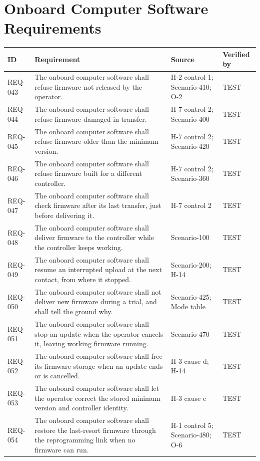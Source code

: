 \documentclass[11pt,a4paper]{article}
\begin{document}
\section{Onboard Computer Software Requirements}
{\footnotesize
\begin{xltabular}{\textwidth}{@{}l>{\raggedright\arraybackslash}X>{\raggedright\arraybackslash}p{3.2cm}>{\raggedright\arraybackslash}p{3.0cm}@{}}
\toprule
ID & Requirement & Source & Verified by \\
\midrule
\endhead
REQ-043 & The onboard computer software shall refuse firmware not released by the operator. & H-2 control 1; Scenario-410; O-2 & TEST \\
REQ-044 & The onboard computer software shall refuse firmware damaged in transfer. & H-7 control 2; Scenario-400 & TEST \\
REQ-045 & The onboard computer software shall refuse firmware older than the minimum version. & H-7 control 2; Scenario-420 & TEST \\
REQ-046 & The onboard computer software shall refuse firmware built for a different controller. & H-7 control 2; Scenario-360 & TEST \\
REQ-047 & The onboard computer software shall check firmware after its last transfer, just before delivering it. & H-7 control 2 & TEST \\
REQ-048 & The onboard computer software shall deliver firmware to the controller while the controller keeps working. & Scenario-100 & TEST \\
REQ-049 & The onboard computer software shall resume an interrupted upload at the next contact, from where it stopped. & Scenario-200; H-14 & TEST \\
REQ-050 & The onboard computer software shall not deliver new firmware during a trial, and shall tell the ground why. & Scenario-425; Mode table & TEST \\
REQ-051 & The onboard computer software shall stop an update when the operator cancels it, leaving working firmware running. & Scenario-470 & TEST \\
REQ-052 & The onboard computer software shall free its firmware storage when an update ends or is cancelled. & H-3 cause d; H-14 & TEST \\
REQ-053 & The onboard computer software shall let the operator correct the stored minimum version and controller identity. & H-3 cause c & TEST \\
REQ-054 & The onboard computer software shall restore the last-resort firmware through the reprogramming link when no firmware can run. & H-1 control 5; Scenario-480; O-6 & TEST \\

\end{xltabular}}
\end{document}
